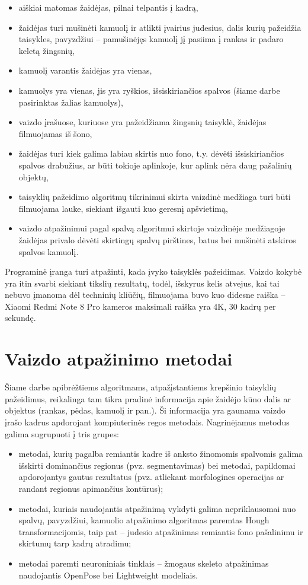 \documentclass{VUMIFPSbakalaurinis}
\begin{document}
\begin{itemize}
	\item aiškiai matomas žaidėjas, pilnai telpantis į kadrą,
	\item žaidėjas turi mušinėti kamuolį ir atlikti įvairius judesius, dalis kurių pažeidžia taisykles, pavyzdžiui – pamušinėjęs kamuolį jį pasiima į rankas ir padaro keletą žingsnių,
	\item kamuolį varantis žaidėjas yra vienas, 
	\item kamuolys yra vienas, jis yra ryškios, išsiskiriančios spalvos (šiame darbe pasirinktas žalias kamuolys), 
	\item vaizdo įrašuose, kuriuose yra pažeidžiama žingsnių taisyklė, žaidėjas filmuojamas iš šono,
	\item žaidėjas turi kiek galima labiau skirtis nuo fono, t.y. dėvėti išsiskiriančios spalvos drabužius, ar būti tokioje aplinkoje, kur aplink nėra daug pašalinių objektų,
	\item taisyklių pažeidimo algoritmų tikrinimui skirta vaizdinė medžiaga turi būti filmuojama lauke, siekiant išgauti kuo geresnį apšvietimą, 
	\item vaizdo atpažinimui pagal spalvą algoritmui skirtoje vaizdinėje medžiagoje žaidėjas privalo dėvėti skirtingų spalvų pirštines, batus bei mušinėti atskiros spalvos kamuolį.
\end{itemize}

Programinė įranga turi atpažinti, kada įvyko taisyklės pažeidimas. Vaizdo kokybė yra itin svarbi siekiant tikslių rezultatų, todėl, išskyrus kelis atvejus, kai tai nebuvo įmanoma dėl techninių kliūčių, filmuojama buvo kuo didesne raiška – Xiaomi Redmi Note 8 Pro kameros maksimali raiška yra 4K, 30 kadrų per sekundę. 

\section{Vaizdo atpažinimo metodai}

Šiame darbe apibrėžtiems algoritmams, atpažįstantiems krepšinio taisyklių pažeidimus, reikalinga tam tikra pradinė informacija apie žaidėjo kūno dalis ar objektus (rankas, pėdas, kamuolį ir pan.). Ši informacija yra gaunama vaizdo įrašo kadrus apdorojant kompiuterinės regos metodais. 
Nagrinėjamus metodus galima sugrupuoti į tris grupes: 

\begin{itemize}
	\item metodai, kurių pagalba remiantis kadre iš anksto žinomomis spalvomis galima išskirti dominančius regionus (pvz. segmentavimas) bei metodai, papildomai apdorojantys gautus rezultatus (pvz. atliekant morfologines operacijas ar randant regionus apimančius kontūrus);
	\item metodai, kuriais naudojantis atpažinimą vykdyti galima nepriklausomai nuo spalvų, pavyzdžiui, kamuolio atpažinimo algoritmas paremtas Hough transformacijomis, taip pat – judesio atpažinimas remiantis fono pašalinimu ir skirtumų tarp kadrų atradimu;
	\item metodai paremti neuroniniais tinklais – žmogaus skeleto atpažinimas naudojantis OpenPose bei Lightweight modeliais. 
\end{itemize}
\end{document}

